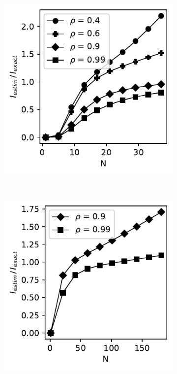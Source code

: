 \documentclass[../Thesis.tex]{subfiles}
\begin{document}
\begin{figure}[H]
\begin{subfigure}[t]{0.32\textwidth}
        \includegraphics[width=\linewidth]{figures/ND examples/MI calc/gaussian example original high corr - B-spline.pdf}
        \caption{}
    \end{subfigure}%
    ~
    \begin{subfigure}[t]{0.32\textwidth}
        \centering
        \includegraphics[width=\linewidth]{figures/ND examples/MI calc/gaussian example original zoom - B-spline.pdf}

\end{subfigure}
\end{figure}
\end{document}

